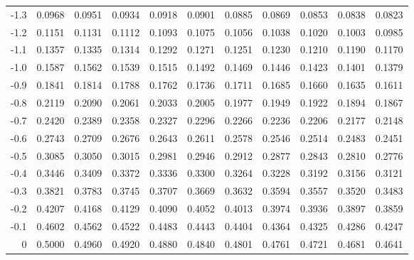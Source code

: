 \begin{table}[ht]
\begin{tabular}{rrrrrrrrrrr}
      -1.3 & 0.0968 & 0.0951 & 0.0934 & 0.0918 & 0.0901 & 0.0885 & 0.0869 & 0.0853 & 0.0838 & 0.0823 \\
      -1.2 & 0.1151 & 0.1131 & 0.1112 & 0.1093 & 0.1075 & 0.1056 & 0.1038 & 0.1020 & 0.1003 & 0.0985 \\
      -1.1 & 0.1357 & 0.1335 & 0.1314 & 0.1292 & 0.1271 & 0.1251 & 0.1230 & 0.1210 & 0.1190 & 0.1170 \\
      -1.0 & 0.1587 & 0.1562 & 0.1539 & 0.1515 & 0.1492 & 0.1469 & 0.1446 & 0.1423 & 0.1401 & 0.1379 \\
      -0.9 & 0.1841 & 0.1814 & 0.1788 & 0.1762 & 0.1736 & 0.1711 & 0.1685 & 0.1660 & 0.1635 & 0.1611 \\
      -0.8 & 0.2119 & 0.2090 & 0.2061 & 0.2033 & 0.2005 & 0.1977 & 0.1949 & 0.1922 & 0.1894 & 0.1867 \\
      -0.7 & 0.2420 & 0.2389 & 0.2358 & 0.2327 & 0.2296 & 0.2266 & 0.2236 & 0.2206 & 0.2177 & 0.2148 \\
      -0.6 & 0.2743 & 0.2709 & 0.2676 & 0.2643 & 0.2611 & 0.2578 & 0.2546 & 0.2514 & 0.2483 & 0.2451 \\
      -0.5 & 0.3085 & 0.3050 & 0.3015 & 0.2981 & 0.2946 & 0.2912 & 0.2877 & 0.2843 & 0.2810 & 0.2776 \\
      -0.4 & 0.3446 & 0.3409 & 0.3372 & 0.3336 & 0.3300 & 0.3264 & 0.3228 & 0.3192 & 0.3156 & 0.3121 \\
      -0.3 & 0.3821 & 0.3783 & 0.3745 & 0.3707 & 0.3669 & 0.3632 & 0.3594 & 0.3557 & 0.3520 & 0.3483 \\
      -0.2 & 0.4207 & 0.4168 & 0.4129 & 0.4090 & 0.4052 & 0.4013 & 0.3974 & 0.3936 & 0.3897 & 0.3859 \\
      -0.1 & 0.4602 & 0.4562 & 0.4522 & 0.4483 & 0.4443 & 0.4404 & 0.4364 & 0.4325 & 0.4286 & 0.4247 \\
      0 & 0.5000 & 0.4960 & 0.4920 & 0.4880 & 0.4840 & 0.4801 & 0.4761 & 0.4721 & 0.4681 & 0.4641 \\ 
       \hline
    \end{tabular}
\end{table}
